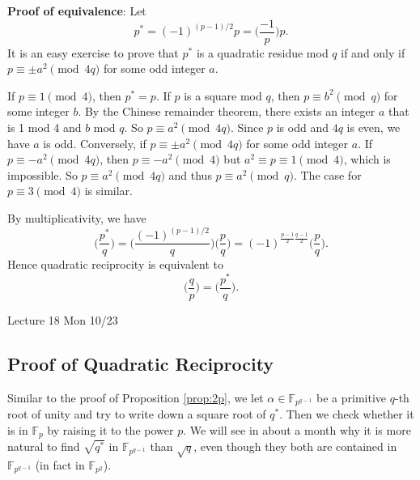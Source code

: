 \documentclass{article}
\def\F{{\mathbb F}}
\def\F{{\mathbb F}}
\newcommand{\add}[1]{{\color{blue} #1}}
\renewcommand{\lg}[2]{\Big(\frac{#1}{#2}\Big)}
\begin{document}
\noindent\textbf{Proof of equivalence}: Let $$p^* = (-1)^{(p-1)/2}p = \lg{-1}{p}p.$$ It is an easy exercise to prove that $p^*$ is a quadratic residue mod $q$ if and only if $p\equiv \pm a^2\pmod{4q}$ for some odd integer $a$. 

If $p\equiv 1\pmod{4}$, then $p^* = p$. If $p$ is a square mod $q$, then $p\equiv b^2\pmod{q}$ for some integer $b$. By the Chinese remainder theorem, there exists an integer $a$ that is 1 mod 4 and $b$ mod $q$. So $p\equiv a^2\pmod{4q}$. Since $p$ is odd and $4q$ is even, we have $a$ is odd. Conversely, if $p\equiv \pm a^2\pmod{4q}$ for some odd integer $a$. If $p\equiv -a^2\pmod{4q}$, then $p\equiv -a^2\pmod{4}$ but $a^2\equiv p \equiv 1\pmod{4}$, which is impossible. So $p\equiv a^2\pmod{4q}$ and thus $p\equiv a^2\pmod{q}$. The case for $p\equiv 3\pmod{4}$ is similar. 

By multiplicativity, we have
$$\lg{p^*}{q} = \lg{(-1)^{(p-1)/2}}{q}\lg{p}{q} = (-1)^{\frac{p-1}{2}\frac{q-1}{2}}\lg{p}{q}.$$
Hence quadratic reciprocity is equivalent to $$\lg{q}{p} = \lg{p^*}{q}.$$

\begin{comment}
    In number theory, it is sometimes more natural to take $$q^* = (-1)^{(q-1)/2}q = \lg{-1}{q}q.$$
Then $$\lg{q^*}{p} = \lg{(-1)^{(q-1)/2}}{p}\lg{q}{p} = (-1)^{\frac{p-1}{2}\frac{q-1}{2}}\lg{q}{p}.$$
When expressed in this notation, quadratic reciprocity may be restated as 
\end{comment}


\begin{center}
    \add{Lecture 18 Mon 10/23}
\end{center}

\subsection*{Proof of Quadratic Reciprocity}
Similar to the proof of Proposition \ref{prop:2p}, we let $\alpha\in\F_{p^{q-1}}$ be a primitive $q$-th root of unity and try to write down a square root of $q^*$. Then we check whether it is in $\F_p$ by raising it to the power $p$. We will see in about a month why it is more natural to find $\sqrt{q^*}$ in $\F_{p^{q-1}}$ than $\sqrt{q}$, even though they both are contained in $\F_{p^{q-1}}$ (in fact in $\F_{p^2}$). 
\end{document}
